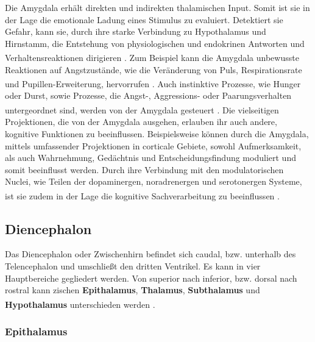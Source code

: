 \documentclass[12pt,a4paper,pdftex]{article}
\begin{document}
\noindent Die Amygdala erhält direkten und indirekten thalamischen Input. Somit ist sie in der Lage die emotionale Ladung eines Stimulus zu evaluiert. Detektiert sie Gefahr, kann sie, durch ihre starke  Verbindung zu Hypothalamus und Hirnstamm, die Entstehung von physiologischen und endokrinen Antworten und Verhaltensreaktionen dirigieren \textsuperscript{\cite[48]{kandel2013principles}}. Zum Beispiel kann die Amygdala unbewusste Reaktionen auf Angstzustände, wie die Veränderung von Puls, Respirationsrate und Pupillen-Erweiterung,  hervorrufen \textsuperscript{\cite[15]{kandel2013principles}}.
Auch instinktive Prozesse, wie Hunger oder Durst, sowie Prozesse, die Angst-, Aggressions- oder Paarungsverhalten untergeordnet sind, werden von der Amygdala gesteuert \textsuperscript{\cite[18]{kandel2013principles}}.
Die vielseitigen Projektionen, die von der Amygdala ausgehen, erlauben ihr auch andere, kognitive Funktionen zu beeinflussen. Beispielsweise können durch die Amygdala, mittels umfassender Projektionen in corticale Gebiete, sowohl Aufmerksamkeit, als auch Wahrnehmung, Gedächtnis und Entscheidungsfindung moduliert und somit beeinflusst werden. Durch ihre Verbindung mit den modulatorischen Nuclei, wie Teilen der dopaminergen, noradrenergen und serotonergen Systeme, ist sie zudem in der Lage die kognitive Sachverarbeitung zu beeinflussen \textsuperscript{\cite[48]{kandel2013principles}}.


\subsection{Diencephalon}
\label{subsec:Diencephalon} 

Das Diencephalon oder Zwischenhirn befindet sich caudal, bzw. unterhalb des Telencephalon und umschließt den dritten Ventrikel. Es kann in vier Hauptbereiche gegliedert werden. Von superior nach inferior, bzw. dorsal nach rostral kann zischen \textbf{Epithalamus}, \textbf{Thalamus}, \textbf{Subthalamus}  und \textbf{Hypothalamus} unterschieden werden \textsuperscript{\cite[16]{crossman2014neuroanatomy}}.

\subsubsection{Epithalamus}
\label{subsubsec:Epithalamus} 
\end{document}
